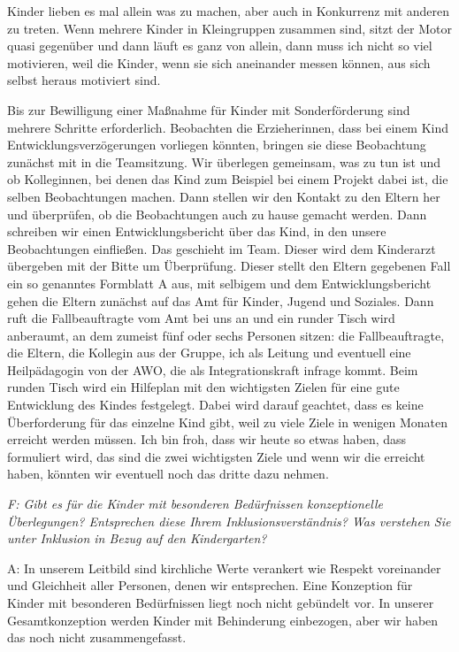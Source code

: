 \begin{linenumbers*}
Kinder lieben es mal allein was zu machen, aber auch in Konkurrenz mit anderen zu treten. Wenn mehrere Kinder in Kleingruppen zusammen sind, sitzt der Motor quasi gegenüber und dann läuft es ganz von allein, dann muss ich nicht so viel motivieren, weil die Kinder, wenn sie sich aneinander messen können, aus sich selbst heraus motiviert sind.

Bis zur Bewilligung einer Maßnahme für Kinder mit Sonderförderung sind mehrere Schritte erforderlich. 
Beobachten die Erzieherinnen, dass bei einem Kind Entwicklungsverzögerungen vorliegen könnten, bringen sie diese Beobachtung zunächst mit in die Teamsitzung. Wir überlegen gemeinsam, was zu tun ist und ob Kolleginnen, bei denen das Kind zum Beispiel bei einem Projekt dabei ist, die selben Beobachtungen machen. Dann stellen wir den Kontakt zu den Eltern her und überprüfen, ob die Beobachtungen auch zu hause gemacht werden.   
Dann schreiben wir einen Entwicklungsbericht über das Kind, in den unsere Beobachtungen einfließen. Das geschieht im Team. Dieser wird dem Kinderarzt übergeben mit der Bitte um Überprüfung. Dieser stellt den Eltern gegebenen Fall ein so genanntes Formblatt A aus, mit selbigem und dem Entwicklungsbericht gehen die Eltern zunächst auf das Amt für Kinder, Jugend und Soziales. Dann ruft die Fallbeauftragte vom Amt bei uns an und ein runder Tisch wird anberaumt, an dem zumeist fünf oder sechs Personen sitzen: die Fallbeauftragte, die Eltern, die Kollegin aus der Gruppe, ich als Leitung und eventuell eine Heilpädagogin von der AWO, die als Integrationskraft infrage kommt. 
Beim runden Tisch wird ein Hilfeplan mit den wichtigsten Zielen für eine gute Entwicklung des Kindes festgelegt. Dabei wird darauf geachtet, dass es keine Überforderung für das einzelne Kind gibt, weil zu viele Ziele in wenigen Monaten erreicht werden müssen. Ich bin froh, dass wir heute so etwas haben, dass formuliert wird, das sind die zwei wichtigsten Ziele und wenn wir die erreicht haben, könnten wir eventuell noch das dritte dazu nehmen. 

\emph{F: Gibt es für die Kinder mit besonderen Bedürfnissen konzeptionelle Überlegungen? Entsprechen diese Ihrem Inklusionsverständnis?
Was verstehen Sie unter Inklusion in Bezug auf den Kindergarten?} 

A: In unserem Leitbild sind kirchliche Werte verankert wie Respekt voreinander und Gleichheit aller Personen, denen wir entsprechen. Eine Konzeption für Kinder mit besonderen Bedürfnissen liegt noch nicht gebündelt vor. In unserer Gesamtkonzeption werden Kinder mit Behinderung einbezogen, aber wir haben das noch nicht zusammengefasst. 


\end{linenumbers*}
